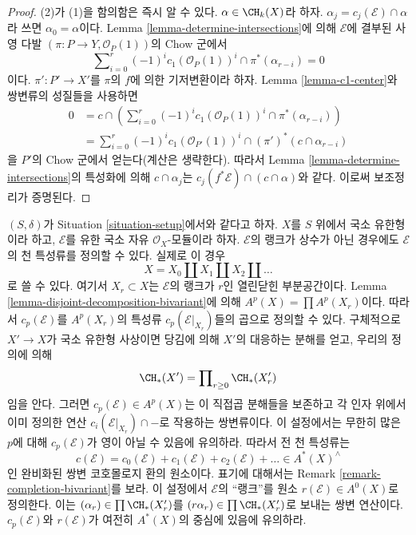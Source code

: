 \begin{proof}
(2)가 (1)을 함의함은 즉시 알 수 있다. $\alpha \in \CH_k(X)$라 하자.
$\alpha_j = c_j(\mathcal{E}) \cap \alpha$라 쓰면
$\alpha_0 = \alpha$이다. Lemma \ref{lemma-determine-intersections}에
의해 $\mathcal{E}$에 결부된 사영 다발
$(\pi : P \to Y, \mathcal{O}_P(1))$의 Chow 군에서
$$
\sum\nolimits_{i = 0}^r
(-1)^i c_1(\mathcal{O}_P(1))^i \cap
\pi^*(\alpha_{r - i}) = 0
$$
이다. $\pi' : P' \to X'$를 $\pi$의 $f$에 의한 기저변환이라 하자.
Lemma \ref{lemma-c1-center}와 쌍변류의
성질들을 사용하면
\begin{align*}
0 & = c \cap \left(\sum\nolimits_{i = 0}^r
(-1)^i c_1(\mathcal{O}_P(1))^i \cap
\pi^*(\alpha_{r - i})\right) \\
& =
\sum\nolimits_{i = 0}^r
(-1)^i c_1(\mathcal{O}_{P'}(1))^i \cap
(\pi')^*(c \cap \alpha_{r - i})
\end{align*}
을 $P'$의 Chow 군에서 얻는다(계산은 생략한다). 따라서 Lemma
\ref{lemma-determine-intersections}의 특성화에 의해
$c \cap \alpha_j$는
$c_j(f^*\mathcal{E}) \cap (c \cap \alpha)$와 같다. 이로써 보조정리가
증명된다.
\end{proof}

\begin{remark}
\label{remark-extend-to-finite-locally-free}
$(S, \delta)$가 Situation \ref{situation-setup}에서와 같다고 하자.
$X$를 $S$ 위에서 국소 유한형이라 하고, $\mathcal{E}$를 유한 국소
자유 $\mathcal{O}_X$-모듈이라 하자. $\mathcal{E}$의 랭크가 상수가
아닌 경우에도 $\mathcal{E}$의 천 특성류를 정의할 수 있다. 실제로
이 경우
$$
X = X_0 \amalg X_1 \amalg X_2 \amalg \ldots
$$
로 쓸 수 있다. 여기서 $X_r \subset X$는 $\mathcal{E}$의 랭크가
$r$인 열린닫힌 부분공간이다. Lemma
\ref{lemma-disjoint-decomposition-bivariant}에 의해
$A^p(X) = \prod A^p(X_r)$이다. 따라서 $c_p(\mathcal{E})$를
$A^p(X_r)$의 특성류 $c_p(\mathcal{E}|_{X_r})$들의 곱으로 정의할 수
있다. 구체적으로 $X' \to X$가 국소 유한형 사상이면 당김에 의해
$X'$의 대응하는 분해를 얻고, 우리의 정의에 의해
$$
\CH_*(X') = \prod\nolimits_{r \geq 0} \CH_*(X'_r)
$$
임을 안다. 그러면 $c_p(\mathcal{E}) \in A^p(X)$는 이 직접곱 분해들을
보존하고 각 인자 위에서 이미 정의한 연산
$c_i(\mathcal{E}|_{X_r}) \cap -$로 작용하는 쌍변류이다. 이 설정에서는
무한히 많은 $p$에 대해 $c_p(\mathcal{E})$가 영이 아닐 수 있음에
유의하라. 따라서 전 천 특성류는
$$
c(\mathcal{E}) =
c_0(\mathcal{E}) + c_1(\mathcal{E}) + c_2(\mathcal{E}) + \ldots
\in A^*(X)^\wedge
$$
인 완비화된 쌍변 코호몰로지 환의 원소이다. 표기에 대해서는 Remark
\ref{remark-completion-bivariant}를 보라. 이 설정에서
$\mathcal{E}$의 “랭크”를 원소
$r(\mathcal{E}) \in A^0(X)$로 정의한다. 이는
$(\alpha_r) \in \prod \CH_*(X'_r)$를
$(r\alpha_r) \in \prod \CH_*(X'_r)$로 보내는 쌍변 연산이다.
$c_p(\mathcal{E})$와 $r(\mathcal{E})$가 여전히 $A^*(X)$의 중심에
있음에 유의하라.
\end{remark}

